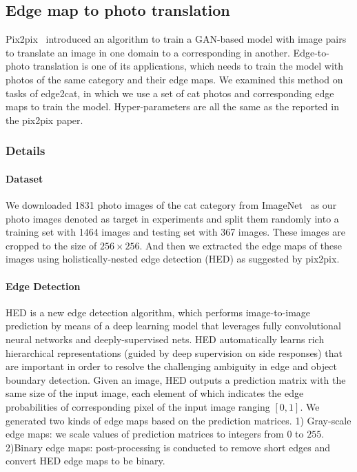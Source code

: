 \subsection{Edge map to photo translation}
Pix2pix~\cite{pix2pix} introduced an algorithm to train a GAN-based model with image pairs to translate an image in one domain to a corresponding in another. Edge-to-photo translation is one of its applications, which needs to train the model with photos of the same category and their edge maps. We examined this method on tasks of edge2cat, in which we use a set of cat photos and corresponding edge maps to train the model. Hyper-parameters are all the same as the reported in the pix2pix paper.
\subsubsection{Details}
\paragraph{Dataset}
We downloaded 1831 photo images of the cat category from ImageNet~\cite{ImageNet} as our photo images denoted as target in experiments and split them randomly into a training set with 1464 images and testing set with 367 images. These images are cropped to the size of $256\times 256$. And then we extracted the edge maps of these images using holistically-nested edge detection (HED) as suggested by pix2pix. 
\paragraph{Edge Detection}
HED is a new edge detection algorithm, which performs image-to-image prediction by means of a deep learning model that leverages fully convolutional neural networks and deeply-supervised nets. HED automatically learns rich hierarchical representations (guided by deep supervision on side responses) that are important in order to resolve the challenging ambiguity in edge and object boundary detection. Given an image, HED outputs a prediction matrix with the same size of the input image, each element of which indicates the edge probabilities of corresponding pixel of the input image ranging $[0, 1]$. We generated two kinds of edge maps based on the prediction matrices. 1) Gray-scale edge maps: we scale values of prediction matrices to integers from $0$ to $255$. 2)Binary edge maps: post-processing is conducted to remove short edges and convert HED edge maps to be binary.
